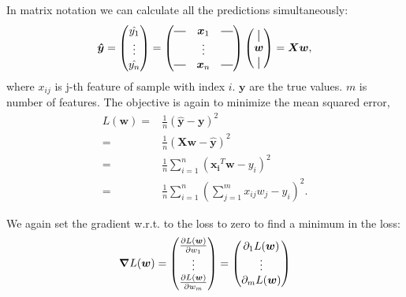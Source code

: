 In matrix notation we can calculate all the predictions simultaneously:
\begin{align}
    \bm{\hat{y}} = 
    \begin{pmatrix}
        \hat{y_{1}} \\
        \vdots\\
        \hat{y_{n}} 
    \end{pmatrix}  =
    \begin{pmatrix}
        \horzbar & \bm{x}_1 & \horzbar \\
                  & \vdots   &  \\
        \horzbar & \bm{x}_n &  \horzbar \\
    \end{pmatrix} 
    \begin{pmatrix}
        \vertbar \\
        \bm{w}\\
        \vertbar
    \end{pmatrix}=\bm{Xw},
\end{align}
where $x_{ij}$ is j-th feature of sample with index $i$. $\bm{y}$ are the true values.
$m$ is number of features.
The objective is again to minimize the mean squared error,
\begin{align}
    L(\bm{w}) =& \frac{1}{n}(\hat{\bm{y}}-\bm{y})^2 \\
              =& \frac{1}{n}(\bm{X}\bm{w}-\hat{\bm{y}})^2 \\
              =& \frac{1}{n}\sum_{i=1}^{n}(\bm{x_{i}}^T\bm{w}-y_{i})^2 \\ 
              =& \frac{1}{n}\sum_{i=1}^{n}\left(\sum_{j=1}^{m}x_{ij}w_{j}-y_{i}\right)^2.
\end{align}

We again set the gradient w.r.t. to the loss to zero to find a minimum in the loss:
\begin{equation*}
  \begin{array}{l}
   \bm{\nabla}L(\bm{w})=
    \begin{pmatrix}
        \pdv{L(\bm{w})}{w_{1}}\\
        \vdots\\
        \pdv{L(\bm{w})}{w_{m}}
    \end{pmatrix}
    =
    \begin{pmatrix}
        \partial_1 L(\bm{w})\\
        \vdots\\
        \partial_m L(\bm{w})
    \end{pmatrix}
  \end{array}
\end{equation*}

